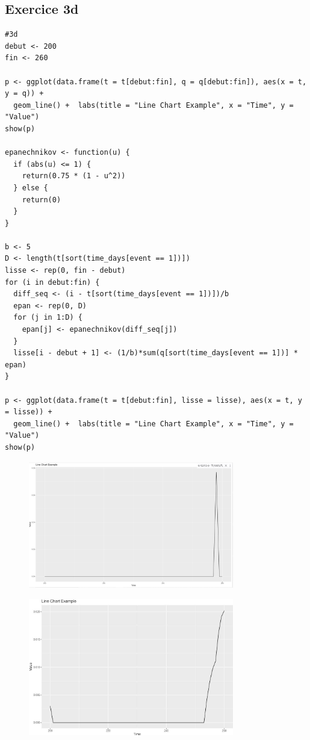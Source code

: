 \documentclass[../main.tex]{subfiles}
\begin{document}
\begin{CJK*}{UTF8}{gbsn}

\section*{Exercice 3d}

\begin{lstlisting}
#3d
debut <- 200
fin <- 260

p <- ggplot(data.frame(t = t[debut:fin], q = q[debut:fin]), aes(x = t, y = q)) +
  geom_line() +  labs(title = "Line Chart Example", x = "Time", y = "Value")
show(p)

epanechnikov <- function(u) {
  if (abs(u) <= 1) {
    return(0.75 * (1 - u^2))
  } else {
    return(0)
  }
}

b <- 5
D <- length(t[sort(time_days[event == 1])])
lisse <- rep(0, fin - debut)
for (i in debut:fin) {
  diff_seq <- (i - t[sort(time_days[event == 1])])/b
  epan <- rep(0, D)
  for (j in 1:D) {
    epan[j] <- epanechnikov(diff_seq[j])
  }
  lisse[i - debut + 1] <- (1/b)*sum(q[sort(time_days[event == 1])] * epan)
}

p <- ggplot(data.frame(t = t[debut:fin], lisse = lisse), aes(x = t, y = lisse)) +
  geom_line() +  labs(title = "Line Chart Example", x = "Time", y = "Value")
show(p)

\end{lstlisting}

\begin{figure}[H]
  \centering
  \includegraphics[width=0.8\textwidth]{3D2.JPG}
  \label{fig:mesh1}
\end{figure}

\begin{figure}[H]
  \centering
  \includegraphics[width=0.8\textwidth]{3D.JPG}
  \label{fig:mesh1}
\end{figure}



\end{CJK*}
\end{document}

